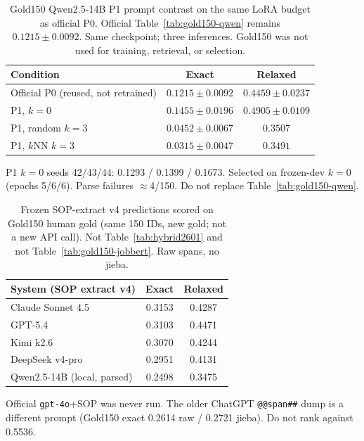 
\begin{table}[t]
\caption{Gold150 Qwen2.5-14B P1 prompt contrast on the same LoRA budget as official P0. Official Table~\ref{tab:gold150-qwen} remains $0.1215\pm0.0092$. Same checkpoint; three inferences. Gold150 was not used for training, retrieval, or selection.}
\label{tab:p1-contrast}
\centering
\begin{tabular}{lcc}
\hline
Condition & Exact & Relaxed \\
\hline
Official P0 (reused, not retrained) & $\mathbf{0.1215\pm0.0092}$ & $0.4459\pm0.0237$ \\
P1, $k{=}0$ & $0.1455\pm0.0196$ & $0.4905\pm0.0109$ \\
P1, random $k{=}3$ & $0.0452\pm0.0067$ & $0.3507$ \\
P1, $k$NN $k{=}3$ & $0.0315\pm0.0047$ & $0.3491$ \\
\hline
\end{tabular}

\vspace{0.4em}
{\small P1 $k{=}0$ seeds 42/43/44: 0.1293 / 0.1399 / 0.1673.
Selected on frozen-dev $k{=}0$ (epochs 5/6/6).
Parse failures $\approx$4/150.
Do not replace Table~\ref{tab:gold150-qwen}.}
\end{table}

\begin{table}[t]
\caption{Frozen SOP-extract v4 predictions scored on Gold150 human gold (same 150 IDs, new gold; not a new API call). Not Table~\ref{tab:hybrid2601} and not Table~\ref{tab:gold150-jobbert}. Raw spans, no jieba.}
\label{tab:gold150-sop-subset}
\centering
\begin{tabular}{lcc}
\hline
System (SOP extract v4) & Exact & Relaxed \\
\hline
Claude Sonnet 4.5 & 0.3153 & 0.4287 \\
GPT-5.4 & 0.3103 & 0.4471 \\
Kimi k2.6 & 0.3070 & 0.4244 \\
DeepSeek v4-pro & 0.2951 & 0.4131 \\
Qwen2.5-14B (local, parsed) & 0.2498 & 0.3475 \\
\hline
\end{tabular}

\vspace{0.4em}
{\small Official \texttt{gpt-4o}+SOP was never run.
The older ChatGPT \texttt{@@span\#\#} dump is a different prompt (Gold150 exact 0.2614 raw / 0.2721 jieba).
Do not rank against 0.5536.}
\end{table}

